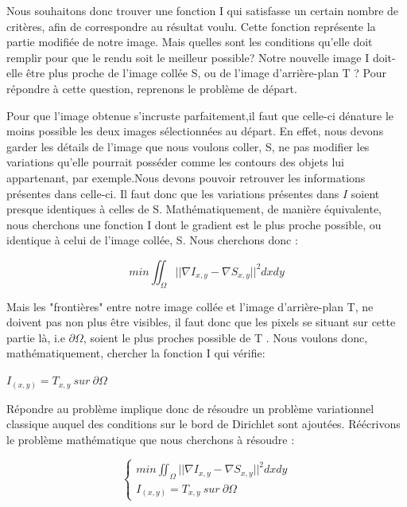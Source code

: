 Nous souhaitons donc trouver une fonction I qui satisfasse un certain nombre de critères, afin de correspondre au résultat voulu.  
Cette fonction représente la partie modifiée de notre image. Mais quelles sont les conditions qu'elle doit remplir pour que le rendu soit le meilleur possible? Notre nouvelle image I doit-elle être plus proche de l'image collée S, ou de l'image d'arrière-plan T ? \newline
Pour répondre à cette question, reprenons le problème de départ. \newline

Pour que l'image obtenue s'incruste parfaitement,il faut que celle-ci dénature le moins possible les deux images sélectionnées au départ. En effet, nous devons garder les détails de l'image que nous voulons coller, S, ne pas modifier les variations qu'elle pourrait posséder comme les contours des objets lui appartenant, par exemple.Nous devons pouvoir retrouver les informations présentes dans celle-ci. Il faut donc que les variations présentes dans $I$ soient presque identiques à celles de S. Mathématiquement, de manière équivalente, nous cherchons une fonction I dont le gradient est le plus proche possible, ou identique à celui de l'image collée, S. Nous cherchons donc :
\begin{center}
    $$ min \iint_\Omega || \nabla I_{x,y} - \nabla S_{x,y}||^2 dxdy$$
\end{center} 

Mais les "frontières" entre notre image collée et l'image d'arrière-plan T, ne doivent pas non plus être visibles, il faut donc que les pixels se situant sur cette partie là, i.e $\partial \Omega$, soient le plus proches possible de T .  Nous voulons donc, mathématiquement, chercher la fonction I qui vérifie: 
\begin{center}
    $I_{(x,y)} = T_{x,y} \ sur\ \partial \Omega$
\end{center}

Répondre au problème implique donc de résoudre un problème variationnel classique auquel des conditions sur le bord de Dirichlet sont ajoutées. 
Réécrivons le problème mathématique que nous cherchons à résoudre :  

\begin{center}
\begin{equation*}
\left\{
\begin{aligned}
 min \iint_\Omega || \nabla I_{x,y} - \nabla S_{x,y}||^2 dxdy\\
 I_{(x,y)} = T_{x,y} \ sur\ \partial \Omega
\end{aligned}
\right.
\end{equation*}
\end{center}


